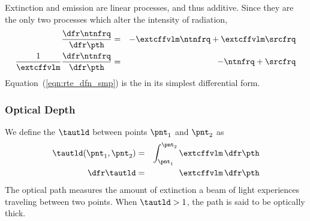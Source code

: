 \documentclass[12pt]{article}
\begin{document}
Extinction and emission are linear processes, and thus additive. 
Since they are the only two processes which alter the intensity of
radiation,
\begin{eqnarray}
\frac{\dfr\ntnfrq}{\dfr\pth} & = & -\extcffvlm \ntnfrq + \extcffvlm \srcfrq \nonumber \\
\frac{1}{\extcffvlm} \frac{\dfr\ntnfrq}{\dfr\pth} & = & -\ntnfrq + \srcfrq
\label{eqn:rte_dfn_smp}
\end{eqnarray}
Equation~(\ref{eqn:rte_dfn_smp}) is the  in its simplest differential form.

\subsubsection[Optical Depth]{Optical Depth}\label{sxn:tau}
We define the  $\tautld$ between
points $\pnt_{1}$ and $\pnt_{2}$ as
\begin{eqnarray}
\tautld(\pnt_{1},\pnt_{2}) & = & \int_{\pnt_{1}}^{\pnt_{2}} \extcffvlm \,\dfr\pth
\nonumber \\ 
\dfr\tautld & = & \extcffvlm \,\dfr\pth
\label{eqn:tau_tld_dfn}
\end{eqnarray}
The optical path measures the amount of extinction a beam of light
experiences traveling between two points.
When $\tautld > 1$, the path is said to be optically thick.
\end{document}
